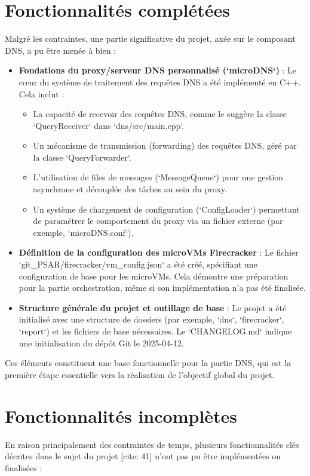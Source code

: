 \documentclass[12pt]{article}
\begin{document}
\section{Fonctionnalités complétées}
Malgré les contraintes, une partie significative du projet, axée sur le composant DNS, a pu être menée à bien :

\begin{itemize}
    \item \textbf{Fondations du proxy/serveur DNS personnalisé (`microDNS`)} : Le cœur du système de traitement des requêtes DNS a été implémenté en C++. Cela inclut :
        \begin{itemize}
            \item La capacité de recevoir des requêtes DNS, comme le suggère la classe `QueryReceiver` dans `dns/src/main.cpp`.
            \item Un mécanisme de transmission (forwarding) des requêtes DNS, géré par la classe `QueryForwarder`.
            \item L'utilisation de files de messages (`MessageQueue`) pour une gestion asynchrone et découplée des tâches au sein du proxy.
            \item Un système de chargement de configuration (`ConfigLoader`) permettant de paramétrer le comportement du proxy via un fichier externe (par exemple, `microDNS.conf`).
        \end{itemize}
    \item \textbf{Définition de la configuration des microVMs Firecracker} : Le fichier `git_PSAR/firecracker/vm_config.json` a été créé, spécifiant une configuration de base pour les microVMs. Cela démontre une préparation pour la partie orchestration, même si son implémentation n'a pas été finalisée.
    \item \textbf{Structure générale du projet et outillage de base} : Le projet a été initialisé avec une structure de dossiers (par exemple, `dns`, `firecracker`, `report`) et les fichiers de base nécessaires. Le `CHANGELOG.md` indique une initialisation du dépôt Git le 2025-04-12.
\end{itemize}
Ces éléments constituent une base fonctionnelle pour la partie DNS, qui est la première étape essentielle vers la réalisation de l'objectif global du projet.

\section{Fonctionnalités incomplètes}
En raison principalement des contraintes de temps, plusieurs fonctionnalités clés décrites dans le sujet du projet [cite: 41] n'ont pas pu être implémentées ou finalisées :
\end{document}

